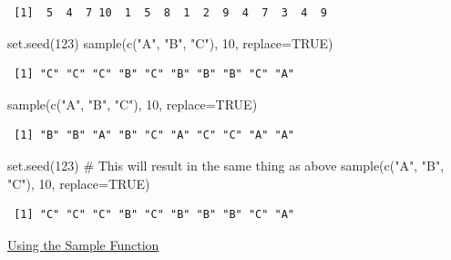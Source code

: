\documentclass[
  letterpaper,
  DIV=11,
  numbers=noendperiod]{scrreprt}
\newenvironment{Shaded}{\begin{snugshade}}{\end{snugshade}}
\newcommand{\AttributeTok}[1]{\textcolor[rgb]{0.40,0.45,0.13}{#1}}
\newcommand{\CommentTok}[1]{\textcolor[rgb]{0.37,0.37,0.37}{#1}}
\newcommand{\ConstantTok}[1]{\textcolor[rgb]{0.56,0.35,0.01}{#1}}
\newcommand{\DecValTok}[1]{\textcolor[rgb]{0.68,0.00,0.00}{#1}}
\newcommand{\FunctionTok}[1]{\textcolor[rgb]{0.28,0.35,0.67}{#1}}
\newcommand{\NormalTok}[1]{\textcolor[rgb]{0.00,0.23,0.31}{#1}}
\newcommand{\StringTok}[1]{\textcolor[rgb]{0.13,0.47,0.30}{#1}}
\begin{document}
\begin{verbatim}
 [1]  5  4  7 10  1  5  8  1  2  9  4  7  3  4  9
\end{verbatim}

\begin{Shaded}
\begin{Highlighting}[]
\FunctionTok{set.seed}\NormalTok{(}\DecValTok{123}\NormalTok{)}
\FunctionTok{sample}\NormalTok{(}\FunctionTok{c}\NormalTok{(}\StringTok{"A"}\NormalTok{, }\StringTok{"B"}\NormalTok{, }\StringTok{"C"}\NormalTok{), }\DecValTok{10}\NormalTok{, }\AttributeTok{replace=}\ConstantTok{TRUE}\NormalTok{)}
\end{Highlighting}
\end{Shaded}

\begin{verbatim}
 [1] "C" "C" "C" "B" "C" "B" "B" "B" "C" "A"
\end{verbatim}

\begin{Shaded}
\begin{Highlighting}[]
\FunctionTok{sample}\NormalTok{(}\FunctionTok{c}\NormalTok{(}\StringTok{"A"}\NormalTok{, }\StringTok{"B"}\NormalTok{, }\StringTok{"C"}\NormalTok{), }\DecValTok{10}\NormalTok{, }\AttributeTok{replace=}\ConstantTok{TRUE}\NormalTok{)}
\end{Highlighting}
\end{Shaded}

\begin{verbatim}
 [1] "B" "B" "A" "B" "C" "A" "C" "C" "A" "A"
\end{verbatim}

\begin{Shaded}
\begin{Highlighting}[]
\FunctionTok{set.seed}\NormalTok{(}\DecValTok{123}\NormalTok{) }\CommentTok{\# This will result in the same thing as above}
\FunctionTok{sample}\NormalTok{(}\FunctionTok{c}\NormalTok{(}\StringTok{"A"}\NormalTok{, }\StringTok{"B"}\NormalTok{, }\StringTok{"C"}\NormalTok{), }\DecValTok{10}\NormalTok{, }\AttributeTok{replace=}\ConstantTok{TRUE}\NormalTok{)}
\end{Highlighting}
\end{Shaded}

\begin{verbatim}
 [1] "C" "C" "C" "B" "C" "B" "B" "B" "C" "A"
\end{verbatim}

\begin{watch}{}{}
    \href{https://youtu.be/8JwzbwIki-g}{Using the Sample Function}
\end{watch}
\end{document}
